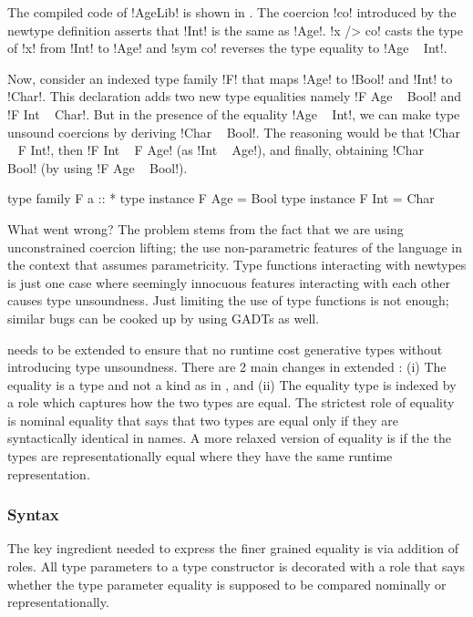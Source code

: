 \documentclass[manuscript,screen,nonacm]{acmart}
\begin{document}
The compiled code of !AgeLib! is shown in . The coercion !co! introduced by the newtype definition asserts that !Int! is the same as !Age!. !x /> co! casts the type of !x! from !Int! to !Age! and !sym co! reverses the type equality to !Age ~ Int!.

Now, consider an indexed type family !F! that maps !Age! to !Bool! and !Int! to !Char!. This declaration adds two new type equalities namely !F Age ~ Bool! and !F Int ~ Char!. But in the presence of the equality !Age ~ Int!, we can make type unsound coercions by deriving !Char ~ Bool!. The reasoning would be that !Char ~ F Int!, then !F Int ~ F Age! (as !Int ~ Age!), and finally, obtaining !Char ~ Bool! (by using !F Age ~ Bool!).

\begin{code}
 type family F a :: *
 type instance F Age = Bool
 type instance F Int = Char
\end{code}

What went wrong? The problem stems from the fact that we are using unconstrained coercion lifting; the use non-parametric features of the language in the context that assumes parametricity. Type functions interacting with newtypes is just one case where seemingly innocuous features interacting with each other causes type unsoundness. Just limiting the use of type functions is not enough; similar bugs can be cooked up by using GADTs as well.

\SFC needs to be extended to ensure that no runtime cost generative types without introducing type unsoundness.
There are 2 main changes in extended \SFR: (i) The equality is a type and not a kind as in \SFC, and (ii) The equality type is indexed by a role which captures how the two types are equal. The strictest role of equality is nominal equality that says that two types are equal only if they are syntactically identical in names. A more relaxed version of equality is if the the types are representationally equal where they have the same runtime representation.
\subsubsection{Syntax}
The key ingredient needed to express the finer grained equality is via addition of roles. All type parameters to a type constructor is decorated with a role that says whether the type parameter equality is supposed to be compared nominally or representationally.
\end{document}
